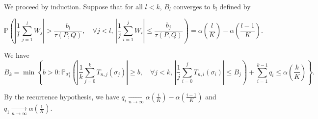 \documentclass{article}
\theoremstyle{plain}
\theoremstyle{remark}
\renewcommand{\P}{\mathbb{P}}
\newcommand{\1}{\mathbbm{1}}
\numberwithin{equation}{section}
\begin{document}
We proceed by induction. Suppose that for all $l <k$, $B_l$ converges to $b_l$ defined by

\begin{equation}\label{eq:induction_hyp}
\P\left( \left|\frac{1}{l}\sum_{j=1}^l W_j\right| > \frac{b_l}{\tau(P,Q)}, \quad \forall j<l,\, \left|\frac{1}{j}\sum_{i=1}^j W_i\right| \le \frac{b_j}{\tau(P,Q)} \right)=\alpha\left(\frac{l}{K} \right) - \alpha\left( \frac{l-1}{K}\right).
\end{equation}

We have
$$B_k = \min \left\{ b>0 : \P_{\sigma_1^k}\left(\left|\frac{1}{k}\sum_{j=0}^k T_{n,j}\left(\sigma_j\right)\right|\ge b, \quad \forall j < k,\,  \left|\frac{1}{j}\sum_{i=0}^j T_{n,i}\left(\sigma_i\right)\right|\le  B_j  \right)+\sum_{i=1}^{k-1}q_i \le\alpha\left(\frac{k}{K}\right)\right\}.$$

By the recurrence hypothesis, we have $q_i \xrightarrow[n \to \infty]{}\alpha\left( \frac{i}{K} \right)-\alpha\left( \frac{i-1}{K} \right)$ and $q_1\xrightarrow[n \to \infty]{}\alpha\left( \frac{1}{K} \right)$.
\end{document}
